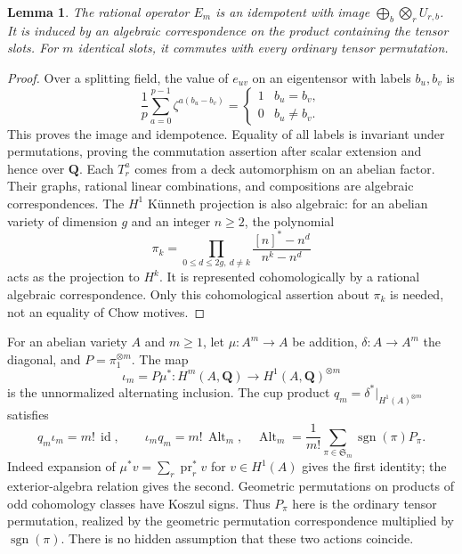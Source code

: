 \documentclass[11pt]{article}
\newtheorem{lemma}[theorem]{Lemma}
\theoremstyle{definition}
\newcommand{\Q}{\mathbf Q}
\newcommand{\Alt}{\operatorname{Alt}}
\newcommand{\id}{\operatorname{id}}
\begin{document}
\begin{lemma}\label{lem:slots}
The rational operator $E_m$ is an idempotent with image
$\bigoplus_b\bigotimes_r U_{r,b}$. It is induced by an algebraic
correspondence on the product containing the tensor slots. For $m$ identical
slots, it commutes with every ordinary tensor permutation.
\end{lemma}
\begin{proof}
Over a splitting field, the value of $e_{uv}$ on an eigentensor with labels
$b_u,b_v$ is
\[
 \frac1p\sum_{a=0}^{p-1}\zeta^{a(b_u-b_v)}
 =\begin{cases}1&b_u=b_v,\\0&b_u\ne b_v.\end{cases}
\]
This proves the image and idempotence. Equality of all labels is invariant under
permutations, proving the commutation assertion after scalar extension and
hence over $\Q$. Each $T_r^a$ comes from a deck automorphism on an abelian
factor. Their graphs, rational linear combinations, and compositions are
algebraic correspondences. The $H^1$ K\"unneth projection is also algebraic:
for an abelian variety of dimension $g$ and an integer $n\geq2$, the polynomial
\[
 \pi_k=\prod_{0\leq d\leq 2g,\ d\ne k}
               \frac{[n]^*-n^d}{n^k-n^d}
\]
acts as the projection to $H^k$. It is represented cohomologically by a
rational algebraic correspondence. Only this cohomological assertion about
$\pi_k$ is needed, not an equality of Chow motives.
\end{proof}

For an abelian variety $A$ and $m\geq1$, let $\mu:A^m\to A$ be addition,
$\delta:A\to A^m$ the diagonal, and
$P=\pi_1^{\otimes m}$. The map
\[
 \iota_m=P\mu^*:H^m(A,\Q)\longrightarrow H^1(A,\Q)^{\otimes m}
\]
is the unnormalized alternating inclusion. The cup product
$q_m=\delta^*|_{H^1(A)^{\otimes m}}$ satisfies
\begin{equation}\label{eq:wedge}
 q_m\iota_m=m!\,\id,\qquad
 \iota_mq_m=m!\,\Alt_m,
 \quad \Alt_m=\frac1{m!}\sum_{\pi\in\mathfrak S_m}
                  \operatorname{sgn}(\pi)P_\pi.
\end{equation}
Indeed expansion of $\mu^*v=\sum_r\operatorname{pr}_r^*v$ for $v\in H^1(A)$
gives the first identity; the exterior-algebra relation gives the second.
Geometric permutations on products of odd cohomology classes have Koszul
signs. Thus $P_\pi$ here is the ordinary tensor permutation, realized by the
geometric permutation correspondence multiplied by $\operatorname{sgn}(\pi)$.
There is no hidden assumption that these two actions coincide.
\end{document}
